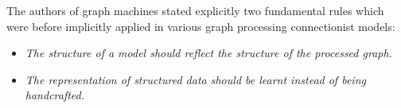 The authors of graph machines stated explicitly two fundamental rules which were before implicitly applied in various graph processing connectionist models:
\begin{itemize}
	\item \emph{The structure of a model should reflect the structure of the processed graph.}
	\item \emph{The representation of structured data should be learnt instead of being handcrafted.~\cite{goulon2005hopfield}} 
\end{itemize}
